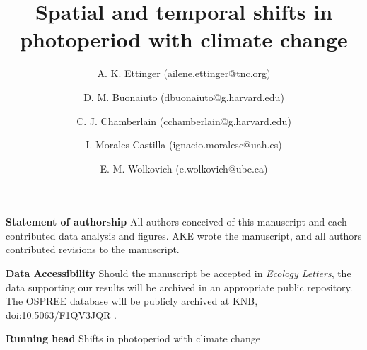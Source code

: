 \documentclass{article}
\begin{document}


\title{Spatial and temporal shifts in photoperiod with climate change} %


\author[1,2,a]{A. K. Ettinger (ailene.ettinger@tnc.org)}
\author[2,3]{D. M. Buonaiuto (dbuonaiuto@g.harvard.edu)}

\author[2,3]{C. J. Chamberlain (cchamberlain@g.harvard.edu)}

\author[2,3,4,5]{I. Morales-Castilla (ignacio.moralesc@uah.es)}

\author[2,3,6]{E. M. Wolkovich (e.wolkovich@ubc.ca)}






 



\maketitle %
\textbf{Statement of authorship} 
All authors conceived of this manuscript and each contributed data analysis and figures. AKE wrote the manuscript, and all authors contributed revisions to the manuscript. 

\textbf{Data Accessibility} Should the manuscript be accepted in \emph{Ecology Letters}, the data supporting our results will be archived in an appropriate public repository. The OSPREE database will be publicly archived at KNB, doi:10.5063/F1QV3JQR \citep{wolkovich2019}.

\textbf{Running head} Shifts in photoperiod with climate change
\end{document}
